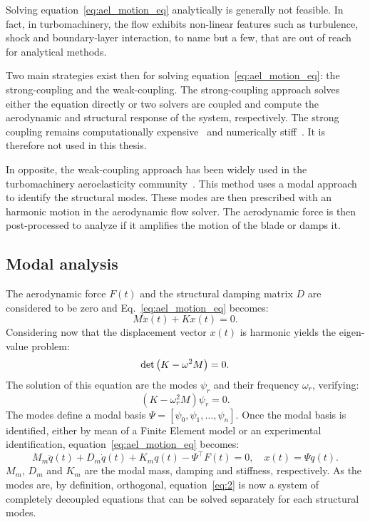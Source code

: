 
Solving equation~\ref{eq:ael_motion_eq} analytically is generally 
not feasible. In fact, in turbomachinery, 
the flow exhibits non-linear features such as turbulence, shock and
boundary-layer interaction, to name but a few, that are out of reach for
analytical methods.

Two main strategies exist then for solving equation~\ref{eq:ael_motion_eq}:
the strong-coupling and the weak-coupling. The strong-coupling 
approach solves either the equation directly or two solvers are coupled and 
compute the aerodynamic and structural response of the system, respectively.
The strong coupling remains computationally expensive~\cite{Bartels2007}
and numerically stiff~\cite{Datta2008}.
It is therefore not used in this thesis.

In opposite, the weak-coupling approach has been widely used
in the turbomachinery aeroelasticity community~\cite{Marshall1996}.
This method uses a modal approach to identify the structural modes.
These modes are then prescribed with an harmonic motion in the aerodynamic
flow solver. The aerodynamic force is then post-processed to 
analyze if it amplifies the motion of the blade or damps it.

\subsection{Modal analysis}
\label{sub:modal_analysis}

The aerodynamic force $F(t)$ and
the structural damping matrix $D$ are considered to be zero
and Eq.~\eqref{eq:ael_motion_eq} becomes:
\begin{equation}
	M \ddot{x}(t) + K x(t) = 0.
	\label{eq:ael_motion_eq_free_response}
\end{equation}
Considering now that the displacement vector $x(t)$ is harmonic
yields the eigen-value problem:
\begin{equation}
	\mdet \left(K - \omega^2 M  \right) = 0.
	\label{eq:ael_motion_eq_eigen_value}
\end{equation}
The solution of this equation are the modes $\psi_r$
and their frequency $\omega_r$, verifying:
\begin{equation}
	\left(K - \omega_r^2 M  \right) \psi_r = 0.
\end{equation}
The modes define a modal basis 
$\Psi = [\psi_0, \psi_1, \dots, \psi_n]$.
Once the modal basis
is identified, either by mean of a Finite
Element model or an experimental identification, 
equation~\ref{eq:ael_motion_eq} becomes:
\begin{equation}
  \label{eq:2}
  M_m \ddot{q}(t) + D_m \dot{q}(t) + K_m q (t) - \Psi^\top F(t)=0, \quad x(t) = \Psi q(t).
\end{equation}
$M_m$, $D_m$ and $K_m$ are the modal mass, 
damping and stiffness, respectively.
As the modes are, by definition, orthogonal, 
equation~\eqref{eq:2} is now a system of completely decoupled equations
that can be solved separately for each structural modes.

